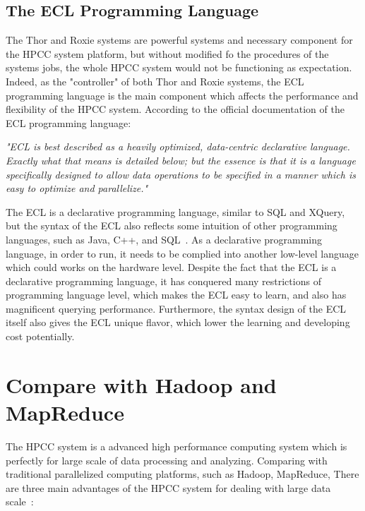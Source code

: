 \subsection{The ECL Programming Language}

The Thor and Roxie systems are powerful systems and necessary component for the HPCC system platform, but without modified fo the procedures of the systems jobs, the whole HPCC system would not be functioning as expectation. Indeed, as the "controller" of both Thor and Roxie systems, the ECL programming language is the main component which affects the performance and flexibility of the HPCC system. According to the official documentation of the ECL programming language:

\textit{"ECL is best described as a heavily optimized, data-centric declarative language. Exactly
what that means is detailed below; but the essence is that it is a language specifically designed to allow data
operations to be specified in a manner which is easy to optimize and parallelize."}~\cite{ECL}


The ECL is a declarative programming language, similar to SQL and XQuery, but the syntax of the ECL also reflects some intuition of other programming languages, such as Java, C++, and SQL~\cite{ECL}. As a declarative programming language, in order to run, it needs to be complied into another low-level language which could works on the hardware level. Despite the fact that the ECL is a declarative programming language, it has conquered many restrictions of programming language level, which makes the ECL easy to learn, and also has magnificent querying performance. Furthermore, the syntax design of the ECL itself also gives the ECL unique flavor, which lower the learning and developing cost potentially. ~\cite{ECL}

\section{Compare with Hadoop and MapReduce}

The HPCC system is a advanced high performance computing system which is perfectly for large scale of data processing and analyzing. Comparing with traditional parallelized computing platforms, such as Hadoop, MapReduce, There are three main advantages of the HPCC system for dealing with large data scale~\cite{Intro4}:

